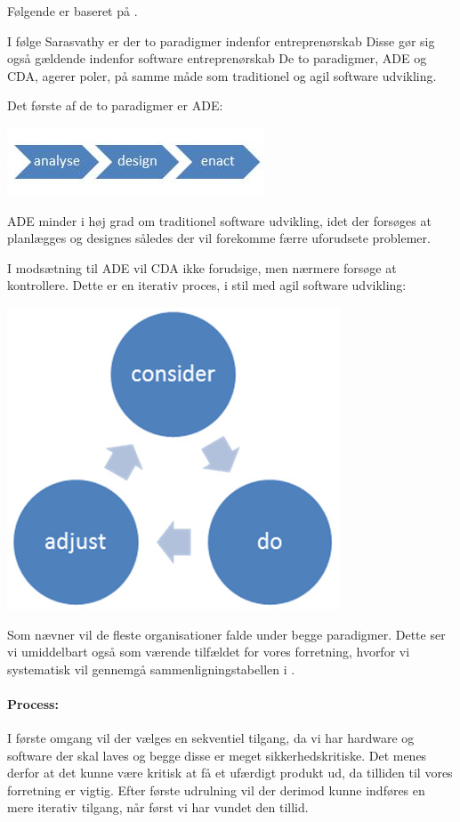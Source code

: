 Følgende er baseret på \cite[pp. 27-38]{rose2012software}.

I følge Sarasvathy er der to paradigmer indenfor entreprenørskab
Disse gør sig også gældende indenfor software entreprenørskab
De to paradigmer, ADE og CDA, agerer poler, på samme måde som traditionel og agil software udvikling.

Det første af de to paradigmer er ADE:\\
\begin{center}
\includegraphics[width=.5\textwidth]{graphics/ade}
\end{center}

ADE minder i høj grad om traditionel software udvikling, idet der forsøges at planlægges og designes således der vil forekomme færre uforudsete problemer.

I modsætning til ADE vil CDA ikke forudsige, men nærmere forsøge at kontrollere.
Dette er en iterativ proces, i stil med agil software udvikling:\\
\begin{center}
\includegraphics[width=.5\textwidth]{graphics/cda}
\end{center}

Som \citet{rose2012software} nævner vil de fleste organisationer falde under begge paradigmer.
Dette ser vi umiddelbart også som værende tilfældet for vores forretning, hvorfor vi systematisk vil gennemgå sammenligningstabellen i \citet[p. 38]{rose2012software}.

\paragraph{Process:}I første omgang vil der vælges en sekventiel tilgang, da vi har hardware og software der skal laves og begge disse er meget sikkerhedskritiske.
Det menes derfor at det kunne være kritisk at få et ufærdigt produkt ud, da tilliden til vores forretning er vigtig.
Efter første udrulning vil der derimod kunne indføres en mere iterativ tilgang, når først vi har vundet den tillid.

